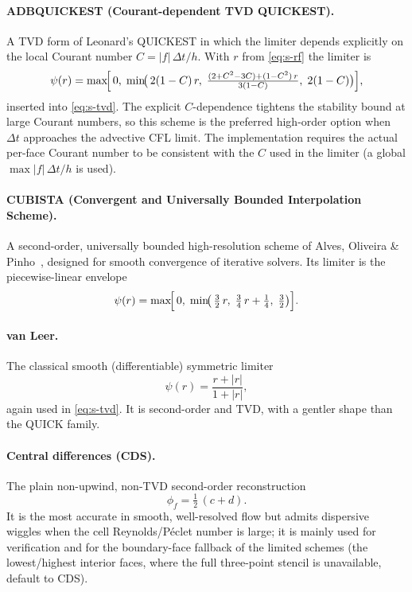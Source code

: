 \documentclass[10pt,onecolumn]{article}
\begin{document}
\paragraph{ADBQUICKEST (Courant-dependent TVD QUICKEST).}
A TVD form of Leonard's QUICKEST in which the limiter depends explicitly
on the local Courant number $C=|f|\,\Delta t/h$.  With $r$ from
\eqref{eq:s-rf} the limiter is
\begin{equation}
  \psi(r) = \max\!\Bigl[\,0,\;
    \min\!\bigl(\,2(1-C)\,r,\;
      \tfrac{(2+C^2-3C)+(1-C^2)\,r}{3(1-C)},\;
      2(1-C)\bigr)\Bigr],
  \label{eq:s-abdq}
\end{equation}
inserted into \eqref{eq:s-tvd}.  The explicit $C$-dependence tightens
the stability bound at large Courant numbers, so this scheme is the
preferred high-order option when $\Delta t$ approaches the advective CFL
limit.  The implementation requires the actual per-face Courant number
to be consistent with the $C$ used in the limiter (a global
$\max|f|\,\Delta t/h$ is used).

\paragraph{CUBISTA (Convergent and Universally Bounded Interpolation
Scheme).}
A second-order, universally bounded high-resolution scheme of Alves,
Oliveira \& Pinho~\cite{alves2003convergent}, designed for smooth
convergence of iterative solvers.  Its limiter is the piecewise-linear
envelope
\begin{equation}
  \psi(r) = \max\!\Bigl[\,0,\;
    \min\!\bigl(\,\tfrac{3}{2}\,r,\;
      \tfrac{3}{4}\,r + \tfrac14,\;
      \tfrac{3}{2}\bigr)\Bigr].
  \label{eq:s-cubista}
\end{equation}

\paragraph{van Leer.}
The classical smooth (differentiable) symmetric limiter~\cite{vanleer1979towards}
\begin{equation}
  \psi(r) = \frac{r + |r|}{1 + |r|},
  \label{eq:s-vanleer}
\end{equation}
again used in \eqref{eq:s-tvd}.  It is second-order and TVD, with a
gentler shape than the QUICK family.

\paragraph{Central differences (CDS).}
The plain non-upwind, non-TVD second-order reconstruction
\begin{equation}
  \phi_f = \tfrac12\,(c + d).
  \label{eq:s-cds}
\end{equation}
It is the most accurate in smooth, well-resolved flow but admits
dispersive wiggles when the cell Reynolds/P\'eclet number is large; it
is mainly used for verification and for the boundary-face fallback of
the limited schemes (the lowest/highest interior faces, where the full
three-point stencil is unavailable, default to CDS).
\end{document}
